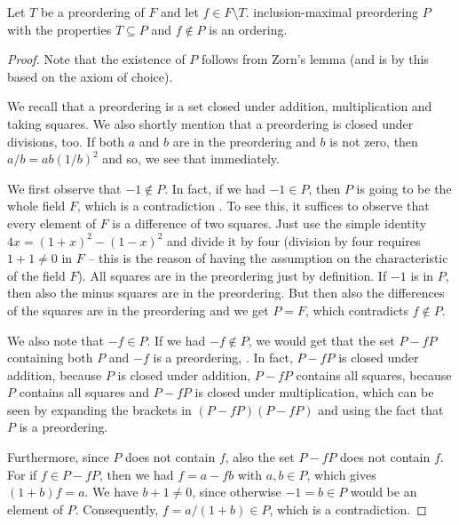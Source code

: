 \begin{lemma}[Serre 1947]
	\label{lem:Serre}
	Let $T$ be a preordering of $F$ and let $f \in F \setminus T$.
	 inclusion-maximal preordering $P$ with the properties $T \subseteq P$ and $f \not\in P$ is an ordering. 
\end{lemma}


\begin{proof}
	Note that the existence of $P$ follows from Zorn's lemma (and is by this based on the axiom of choice).
	
	We recall that a preordering is a set closed under addition, multiplication and taking squares. We also shortly mention that a preordering is closed under divisions, too. If both $a$ and $b$ are in the preordering and $b$ is not zero, then $a/b = a b (1/b)^2$ and so, we see that immediately.
	
	We first observe that $-1 \not\in P$. In fact, if we had $-1 \in P$, then $P$ is going to be the whole field $F$, which is a contradiction . To see this, it suffices to observe that every element of $F$ is a difference of two squares. Just use the simple identity $ 4 x = (1+x)^2 - (1-x)^2$ and divide it by four (division by four requires $1+1 \ne 0$ in $F$ -- this is the reason of having the assumption on the characteristic of the field $F$). All squares are in the preordering just by definition. If $-1$ is in $P$, then also the minus squares are in the preordering. But then also the differences of the squares are in the preordering and we get $P=F$, which contradicts $f \not\in P$. 
	
	
	We also note that $-f \in P$. If we had $-f \not \in P$, we would get that the set $P - f P$ containing both $P$ and $-f$ is a preordering, . In fact, $P - f P$ is closed under addition, because $P$ is closed under addition, $P-f P$ contains all squares, because $P$ contains all squares and $P- f P$ is closed under multiplication, which can be seen by expanding the brackets in $(P -f P)(P - fP)$ and using the fact that $P$ is a preordering. 
	
	Furthermore, since $P$ does not contain $f$, also the set $P - fP$ does not contain $f$. For if $f \in P - fP$, then we had $f = a - f b$ with $a, b \in P$, which gives $(1+b) f = a$. We have $b+1 \ne 0$, since otherwise $-1 = b \in P$ would be an element of $P$. Consequently, $ f= a / (1+b) \in P$, which is a contradiction.
	

\end{proof}
